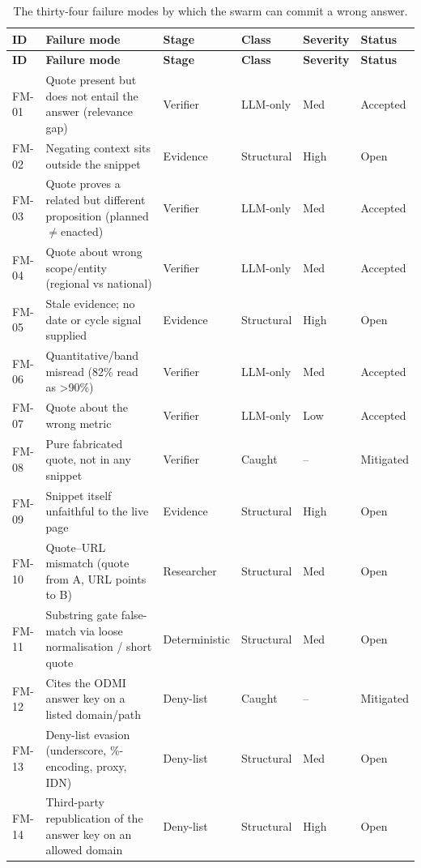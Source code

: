 {\footnotesize
\begin{longtable}[]{@{}
  L{0.0960}
  L{0.3777}
  L{0.1422}
  L{0.1274}
  L{0.1099}
  L{0.1419}@{}}
\caption{The thirty-four failure modes by which the swarm can commit a wrong answer.}\label{tab:failure-register}\\
\toprule\noalign{}
\textbf{ID} & \textbf{Failure mode} & \textbf{Stage} & \textbf{Class} & \textbf{Severity} & \textbf{Status} \\
\midrule\noalign{}
\endfirsthead
\toprule\noalign{}
\textbf{ID} & \textbf{Failure mode} & \textbf{Stage} & \textbf{Class} & \textbf{Severity} & \textbf{Status} \\
\midrule\noalign{}
\endhead
\bottomrule\noalign{}
\endlastfoot
FM-01 & Quote present but does not entail the answer (relevance gap) & Verifier & LLM-only & Med & Accepted \\
FM-02 & Negating context sits outside the snippet & Evidence & Structural & High & Open \\
FM-03 & Quote proves a related but different proposition (planned$\neq$enacted) & Verifier & LLM-only & Med & Accepted \\
FM-04 & Quote about wrong scope/entity (regional vs national) & Verifier & LLM-only & Med & Accepted \\
FM-05 & Stale evidence; no date or cycle signal supplied & Evidence & Structural & High & Open \\
FM-06 & Quantitative/band misread (82\% read as \textgreater90\%) & Verifier & LLM-only & Med & Accepted \\
FM-07 & Quote about the wrong metric & Verifier & LLM-only & Low & Accepted \\
FM-08 & Pure fabricated quote, not in any snippet & Verifier & Caught & -- & Mitigated \\
FM-09 & Snippet itself unfaithful to the live page & Evidence & Structural & High & Open \\
FM-10 & Quote--URL mismatch (quote from A, URL points to B) & Researcher & Structural & Med & Open \\
FM-11 & Substring gate false-match via loose normalisation / short quote & Deterministic & Structural & Med & Open \\
FM-12 & Cites the ODMI answer key on a listed domain/path & Deny-list & Caught & -- & Mitigated \\
FM-13 & Deny-list evasion (underscore, \%-encoding, proxy, IDN) & Deny-list & Structural & Med & Open \\
FM-14 & Third-party republication of the answer key on an allowed domain & Deny-list & Structural & High & Open \\

\end{longtable}}
